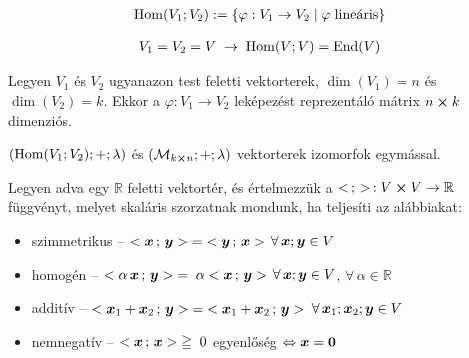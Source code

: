 \documentclass[main.tex]{subfiles}
\begin{document}
\begin{gather*}
  \mathrm{Hom} ( V_1; V_2 ) := \left\{
  \varphi : V_1 \rightarrow V_2 \; | \; \varphi \; \text{lineáris}
  \right\}
\end{gather*}



\begin{gather*}
  V_1 = V_2 = V \; \rightarrow \;
  \mathrm{Hom} ( V; V ) = \mathrm{End} (V)
\end{gather*}




Legyen $V_1$ és $V_2$ ugyanazon test feletti vektorterek,
$\dim(V_1) = n$ és $\dim(V_2) = k$. Ekkor a $\varphi: V_1 \rightarrow V_2$
leképezést reprezentáló mátrix $n \cross k$ dimenziós.

\vspace{.5em}
$\left( \mathrm{Hom}(V_1; V_2); +; \lambda\right)$ és
$\left( \mathcal{M}_{k \cross n}; +; \lambda\right)$
vektorterek izomorfok egymással.




Legyen adva egy $\mathbb{R}$ feletti vektortér,
és értelmezzük a $< \, ; \, > \, : V \cross V \rightarrow \mathbb{R}$
függvényt, melyet skaláris szorzatnak mondunk,
ha teljesíti az alábbiakat:
\begin{itemize}
  \item szimmetrikus
        \tabto{3cm} – \tabto{3.6cm}
        $< \bm{x} \, ; \, \bm{y} >
          \;=\;
          < \bm{y} \, ; \, \bm{x} >$
        \tabto{11cm}
        $\forall \, \bm{x}; \bm{y} \in V$

  \item homogén
        \tabto{3cm} – \tabto{3.6cm}
        $< \alpha \, \bm{x} \, ; \, \bm{y} >
          \;=\;
          \alpha < \bm{x} \, ; \, \bm{y} >$
        \tabto{11cm}
        $\forall \, \bm{x}; \bm{y} \in V$,
        $\forall \, \alpha \in \mathbb{R}$

  \item additív
        \tabto{3cm} – \tabto{3.6cm}
        $< \bm{x}_1 + \bm{x}_2 \, ; \, \bm{y} >
          \;=\;
          < \bm{x}_1 + \bm{x}_2 \, ; \, \bm{y} >$
        \tabto{11cm}
        $\forall \, \bm{x}_1; \bm{x}_2; \bm{y} \in V$

  \item nemnegatív
        \tabto{3cm} – \tabto{3.6cm}
        $< \bm{x} \, ; \, \bm{x} > \; \geqq \; 0$
        \tabto{11cm}
        egyenlőség $\Leftrightarrow \bm{x} = \bm{0}$
\end{itemize}
\end{document}
